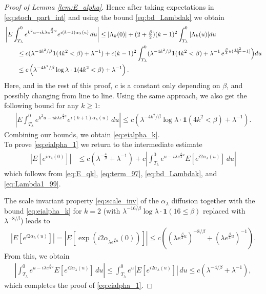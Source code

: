 \documentclass[12pt]{article}
\theoremstyle{definition} %
\theoremstyle{remark} %
\newcommand{\ind}{\mathbf 1}
\begin{document}
\begin{proof}[Proof of Lemma \ref{lem:E_alpha}]
Hence after taking expectations in \eqref{eq:stoch_part_int} and using the bound \eqref{eq:bd_Lambdak} we obtain
\begin{align}\notag
   & \left|E \int_{T_\lambda}^0  e^{k^2 u - i k \lambda e^{\frac{\beta}{4}u}} e^{i (k-1)\alpha_\lambda(u)}\, du\right|\le |\Lambda_k(0)|+(2+\tfrac{\beta}{2})(k-1)^2\int_{T_\lambda}^0 |\Lambda_k(u)|du\\\notag
    &\qquad \le c (\lambda^{-4k^2/\beta} \ind(4k^2<\beta)+\lambda^{-1})+c (k-1)^2 \int_{T_\lambda}^0 (\lambda^{-4k^2/\beta} \ind(4k^2<\beta)
    + \lambda^{-1}\, e^{\frac{\beta}{4}u(\frac{4k^2}{\beta}-1)}\Big) du\\
    &\qquad\le  c \left(\lambda^{-4k^2/\beta} \log \lambda \cdot \ind(4k^2<\beta)+\lambda^{-1}\right)\label{eq:term_98}.
\end{align}
Here, and in the rest of this proof, $c$ is a constant only depending on $\beta$, and possibly changing from line to line. Using the same approach, we also get the following bound for any $k\ge 1$:
\begin{align}
       \left|E \int_{T_\lambda}^0  e^{k^2 u - i k \lambda e^{\frac{\beta}{4}u}} e^{i (k+1)\alpha_\lambda(u)}\, du\right|\le c \left(\lambda^{-4k^2/\beta} \log \lambda \cdot \ind(4k^2<\beta)+\lambda^{-1}\right)\label{eq:term_99}.
\end{align}
Combining our bounds, we obtain \eqref{eq:eialpha_k}. \\
To prove \eqref{eq:eialpha_1} we return to the intermediate estimate
\begin{align}
    |E[e^{i \alpha_\lambda(0)}]|&\le c (\lambda^{-\frac{4}{\beta}}+\lambda^{-1})+c \left|\int_{T_\lambda}^0 e^{u - i \lambda e^{\frac{\beta}{4}u}} E[e^{i 2\alpha_\lambda(u)}]\, du\right|
\end{align}
which follows from \eqref{eq:E_qk}, \eqref{eq:term_97},  \eqref{eq:bd_Lambdak}, and \eqref{eq:Lambda1_99}.

The scale invariant property \eqref{eq:scale_inv}  of the $\alpha_\lambda$ diffusion together with the bound \eqref{eq:eialpha_k} for $k=2$ (with $\lambda^{-16/\beta} \log\lambda \cdot \ind(16\le \beta)$ replaced with $\lambda^{-8/\beta}$) leads to 
\begin{align*}
    \left|E[e^{i 2\alpha_\lambda(u)}]\right|= \left|E[\exp(i 2\alpha_{\lambda  e^{\frac{\beta}{4}u}}(0))]\right|\le c \left((\lambda e^{\frac{\beta}{4}u})^{-8/\beta}+(\lambda e^{\frac{\beta}{4}u})^{-1}\right).
\end{align*}
From this, we  obtain
\begin{align*}
  \left|\int_{T_\lambda}^0 e^{u - i \lambda e^{\frac{\beta}{4}u}} E[e^{i 2\alpha_\lambda(u)}]\, du\right|\le   \int_{T_\lambda}^0 e^{u} \left|E[e^{i 2\alpha_\lambda(u)}]\right|\, du\le c (\lambda^{-4/\beta}+\lambda^{-1}),
\end{align*}
which completes the proof of \eqref{eq:eialpha_1}.
\end{proof}
\end{document}
